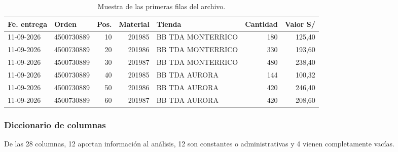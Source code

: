 \iffinal\else
\begin{table}[htbp]
\centering
\caption{Muestra de las primeras filas del archivo.}
\label{tab:muestra}
\small
\begin{tabular}{@{}llrrlrr@{}}
\toprule
\textbf{Fe. entrega} & \textbf{Orden} & \textbf{Pos.} & \textbf{Material} & \textbf{Tienda} & \textbf{Cantidad} & \textbf{Valor S/} \\
\midrule
11-09-2026 & 4500730889 & 10 & 201985 & BB TDA MONTERRICO & 180 & 125,40 \\
11-09-2026 & 4500730889 & 20 & 201986 & BB TDA MONTERRICO & 330 & 193,60 \\
11-09-2026 & 4500730889 & 30 & 201987 & BB TDA MONTERRICO & 480 & 238,40 \\
11-09-2026 & 4500730889 & 40 & 201985 & BB TDA AURORA & 144 & 100,32 \\
11-09-2026 & 4500730889 & 50 & 201986 & BB TDA AURORA & 420 & 246,40 \\
11-09-2026 & 4500730889 & 60 & 201987 & BB TDA AURORA & 420 & 208,60 \\
\bottomrule
\end{tabular}
\end{table}
\fi

\subsubsection{Diccionario de columnas}

De las 28 columnas, 12 aportan información al análisis, 12 son constantes o administrativas y 4 vienen completamente vacías. 

